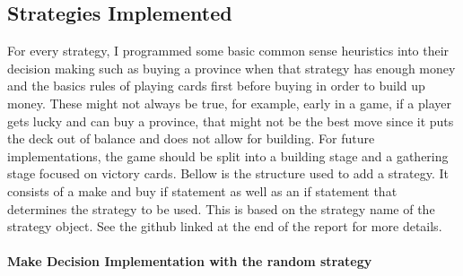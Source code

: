 \documentclass[11pt, oneside]{article}   	%
\begin{document}
\subsection{Strategies Implemented}

For every strategy, I programmed some basic common sense heuristics into their decision making such as buying a province when that strategy has enough money and the basics rules of playing cards first before buying in order to build up money. These might not always be true, for example, early in a game, if a player gets lucky and can buy a province, that might not be the best move since it puts the deck out of balance and does not allow for building. For future implementations, the game should be split into a building stage and a gathering stage focused on victory cards. Bellow is the structure used to add a strategy. It consists of a make and buy if statement as well as an if statement that determines the strategy to be used. This is based on the strategy name of the strategy object. See the github linked at the end of the report for more details.
\\
\\
\textbf{Make Decision Implementation with the random strategy}
\end{document}

